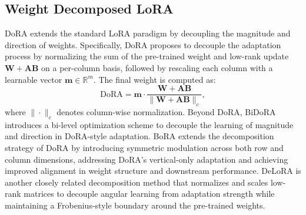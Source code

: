 \subsection{Weight Decomposed LoRA}
DoRA \cite{liu2024dora} extends the standard LoRA paradigm by decoupling the magnitude and direction of weights.
Specifically, DoRA proposes to decouple the adaptation process by normalizing the sum of the pre-trained weight and low-rank update $\mathbf{W} + \mathbf{AB}$ on a per-column basis, followed by rescaling each column with a learnable vector $\mathbf{m} \in \mathbb{R}^m$. The final weight is computed as:
\begin{equation}
\text{DoRA} = \mathbf{m} \cdot \frac{\mathbf{W} + \mathbf{AB}}{\|\mathbf{W} + \mathbf{AB}\|_c},
\end{equation}
where $\|\cdot\|_c$ denotes column-wise normalization.
Beyond DoRA, BiDoRA \cite{qin2024bidora} introduces a bi-level optimization scheme to decouple the learning of magnitude and direction in DoRA-style adaptation. 
BoRA \cite{wang2024bora} extends the decomposition strategy of DoRA by introducing symmetric modulation across both row and column dimensions, addressing DoRA’s vertical-only adaptation and achieving improved alignment in weight structure and downstream performance.
DeLoRA \cite{bini2025delora} is another closely related decomposition method that normalizes and scales low-rank matrices to decouple angular learning from adaptation strength while maintaining a Frobenius-style boundary around the pre-trained weights.

